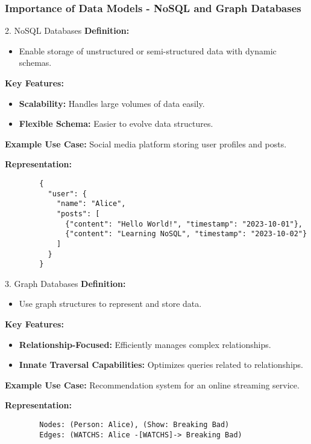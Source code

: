\documentclass[aspectratio=169]{beamer}
\begin{document}
\begin{frame}[fragile]
    \frametitle{Importance of Data Models - NoSQL and Graph Databases}
    \begin{block}{2. NoSQL Databases}
        \textbf{Definition:}
        \begin{itemize}
            \item Enable storage of unstructured or semi-structured data with dynamic schemas.
        \end{itemize}

        \textbf{Key Features:}
        \begin{itemize}
            \item \textbf{Scalability:} Handles large volumes of data easily.
            \item \textbf{Flexible Schema:} Easier to evolve data structures.
        \end{itemize}

        \textbf{Example Use Case:} 
        Social media platform storing user profiles and posts.
        
        \textbf{Representation:}
        \begin{lstlisting}
        {
          "user": {
            "name": "Alice",
            "posts": [
              {"content": "Hello World!", "timestamp": "2023-10-01"},
              {"content": "Learning NoSQL", "timestamp": "2023-10-02"}
            ]
          }
        }
        \end{lstlisting}
    \end{block}
    
    \begin{block}{3. Graph Databases}
        \textbf{Definition:}
        \begin{itemize}
            \item Use graph structures to represent and store data.
        \end{itemize}

        \textbf{Key Features:}
        \begin{itemize}
            \item \textbf{Relationship-Focused:} Efficiently manages complex relationships.
            \item \textbf{Innate Traversal Capabilities:} Optimizes queries related to relationships.
        \end{itemize}

        \textbf{Example Use Case:} 
        Recommendation system for an online streaming service.
        
        \textbf{Representation:}
        \begin{lstlisting}
        Nodes: (Person: Alice), (Show: Breaking Bad)
        Edges: (WATCHS: Alice -[WATCHS]-> Breaking Bad)
        \end{lstlisting}
    \end{block}
\end{frame}
\end{document}

